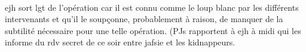 \paragraph{} \gls{ejh} sort \gls{lgt} de l'opération car il est connu comme le loup blanc par les différents intervenants et 
qu'il le soupçonne, probablement à raison, de manquer de la subtilité nécessaire pour une telle opération. (PJs rapportent à 
\gls{ejh} à midi qui les informe du rdv secret de ce soir entre \gls{jafsie} et les kidnappeurs.

